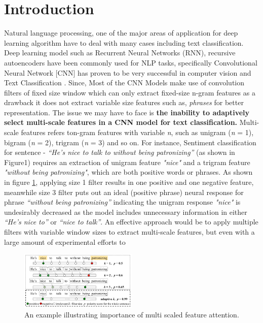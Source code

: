 \documentclass{MX2020}
\begin{document}
\section{Introduction}
Natural language processing, one of the major areas of application for deep learning algorithm have to deal with many cases including text classification. Deep learning model such as Recurrent Neural Networks (RNN), recursive autoencoders have been commonly used for NLP tasks, specifically Convolutional Neural Network [CNN] has proven to be very successful in computer vision and Text Classification  \cite{Kim,Blunsom,Lei,Zhang,Conneau}.
\newline
Since, Most of the CNN Models make use of convolution filters of fixed size window which can only extract fixed-size n-gram \cite{Zhang,Conneau,Wang} features as a drawback it does not extract variable size features such as, {\textit{phrases}} for better representation\cite{ZhangT}. The issue we may have to face is {\bf{the inability to adaptively select
multi-scale features in a CNN model for text classification.}} Multi-scale features refers ton-gram features with variable {\textit{n}}, such as unigram ({\textit{n}} = 1), bigram ({\textit{n}} = 2), trigram ({\textit{n}} = 3) and so on. For instance, Sentiment classification for sentence - {\textit{“He’s nice to talk to without being patronizing”}} (as shown in Figure1) requires an extraction of unigram feature {\textit{"nice"}} and a trigram feature {\textit{"without being patronizing"}}, which are both positive words or phrases. As shown in figure \ref{fig:intro}, applying size 1 filter results in one positive and one negative feature, meanwhile size 3 filter puts out an ideal (positive phrase) neural response for phrase {\textit{“without being patronizing”}} indicating the unigram response {\textit{"nice"}} is undesirably decreased as the model includes unnecessary information in either {\textit{“He’s nice to”}} or {\textit{“nice to talk”}}.
\newline
An effective approach would be to apply multiple filters with variable window sizes to extract multi-scale features, but even with a large amount of experimental efforts to 
\begin{figure}[h]
    \centering
    \includegraphics[width=0.5\textwidth]{intro.png}
    \caption{An example illustrating importance of multi scaled feature attention. \cite{Shiyao}}
    \label{fig:intro}
\end{figure}
\end{document}
